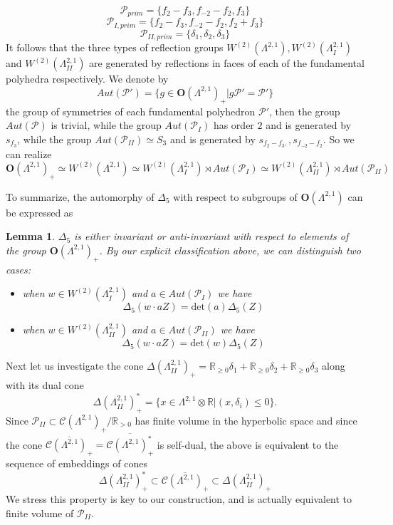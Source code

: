 \documentclass[9pt]{amsart} \usepackage[utf8]{inputenc}
\newtheorem{lemma}{Lemma}
\newcommand{\R}{\mathbb{R}} \newcommand{\La}{\Lambda}
\newcommand{\Orth}{\mathbf{O}}
\newcommand{\Cone}{\mathcal{C}}
\newcommand{\Poly}{\mathcal{P}}
\begin{document}
 $$\Poly_{prim} = \{f_2 - f_3, f_{-2} - f_2, f_3\}$$
 $$\Poly_{I,prim} = \{f_2 -f_3, f_{-2} - f_2, f_2 + f_3\}$$
 $$\Poly_{II,prim} = \{\delta_1, \delta_2, \delta_3\}$$
It follows that the three types of reflection groups $W^{(2)}(\La^{2,1}),
W^{(2)}(\La^{2,1}_I)$ and $W^{(2)}(\La^{2,1}_{II})$ are generated by
reflections in faces of each of the fundamental polyhedra respectively. We denote
by $$Aut(\Poly') = \{g \in \Orth(\La^{2,1})_+ | g \Poly' = \Poly' \}$$ the
group of symmetries of each fundamental polyhedron $\Poly'$, then the group
$Aut(\Poly)$ is trivial, while the group $Aut(\Poly_{I})$ has order
$2$ and is generated by $s_{f_3}$, while the group $Aut(\Poly_{II})
\simeq S_3$ and is generated by $s_{f_2 -f_3,}, s_{f_{-2} - f_2}$. So we
can realize $$\Orth(\La^{2,1})_+ \simeq W^{(2)}(\La^{2,1}) \simeq W^{(2)}(\La^{2,1}_I) \rtimes Aut(\Poly_{I}) \simeq
W^{(2)}(\La^{2,1}_{II}) \rtimes Aut(\Poly_{II})$$

To summarize, the automorphy of $\Delta_5$ with respect to subgroups of
$\Orth(\La^{2,1})$ can be expressed as

\begin{lemma}
$\Delta_5$ is either invariant or anti-invariant with respect to elements
of the group $\Orth(\La^{2,1})_+$. By our explicit classification above, we can
distinguish two cases:
\begin{itemize}
  \item when $w \in W^{(2)}(\La^{2,1}_I)$ and $a \in Aut(\Poly_{I})$ we
  have
  $$\Delta_5(w \cdot a Z) = \text{det}(a) \Delta_5(Z)$$
  \item when $w \in W^{(2)}(\La^{2,1}_{II})$ and $a \in Aut(\Poly_{II})$ we
  have
  $$\Delta_5(w \cdot a Z) = \text{det}(w) \Delta_5(Z)$$
\end{itemize}

\end{lemma}

Next let us investigate the cone $\Delta(\La^{2,1}_{II})_+ = \R_{\geq 0} \delta_1 + \R_{\geq 0} \delta_2
+ \R_{\geq 0} \delta_3$ along with its dual cone
$$\Delta(\La^{2,1}_{II})_+^* = \{ x \in \La^{2,1} \otimes \R | (x,
\delta_i) \leq 0 \}.$$ Since $\Poly_{II} \subset \Cone(\La^{2,1})_+ /
\R_{>0}$ has finite volume in the hyperbolic space and since the cone
$\overline{\Cone(\La^{2,1})_+} = \overline{\Cone(\La^{2,1})_+^*}$ is
self-dual, the above is equivalent to the sequence of embeddings of
cones
$$\Delta(\La^{2,1}_{II})_+^* \subset
\overline{\Cone(\La^{2,1})_+} \subset  \Delta(\La^{2,1}_{II})_+$$
We stress this property is key to our construction, and is actually equivalent to
finite volume of $\Poly_{II}$.
\end{document}
